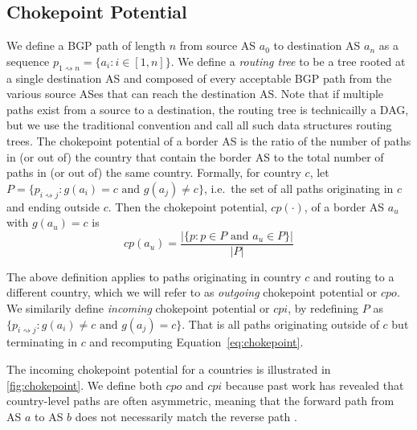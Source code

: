 \subsection{Chokepoint Potential}

We define a BGP path of length $n$ from source AS $a_0$ to destination AS $a_n$
as a sequence $p_{1\rightsquigarrow n} = \{a_i : i \in [1,n]\}$.  We define a
\textit{routing tree} to be a tree rooted at a single destination AS and
composed of every acceptable BGP path from the various source ASes that can
reach the destination AS. Note that if multiple paths exist from a source
to a destination, the routing tree is technicailly a DAG, but we use the traditional convention and call
all such data structures routing trees. The
chokepoint potential of a border AS is the ratio of the number of paths in (or out of) the country that contain the border AS to
the total number of paths in (or out of) the same country.
Formally, for country $c$, let $P = \{p_{i \rightsquigarrow
j} : g(a_i)=c \text{ and } g(a_j)\neq c\} $, i.e.\ the set of all paths
originating in $c$ and ending outside $c$. Then the chokepoint potential,
$cp(\cdot)$, of a border AS $a_u$ with $g(a_u) = c$ is
\begin{equation}
  \label{eq:chokepoint}
  cp(a_u) = \frac{|\{p: p \in P \text{ and } a_u \in P\}|}{|P|}
\end{equation}


The above definition applies to paths originating in country
$c$ and routing to a different country, which we will refer to as
\textit{outgoing} chokepoint potential or $cpo$. We similarily define
\textit{incoming} chokepoint potential or $cpi$, by redefining $P$ as $\{p_{i
\rightsquigarrow j}: g(a_i) \neq c \text{ and } g(a_j) = c\}$. That is all
paths originating outside of $c$ but terminating in $c$ and recomputing
Equation~\ref{eq:chokepoint}. 

The incoming chokepoint
potential for a countries is illustrated in \figurename
\ref{fig:chokepoint}. We define both $cpo$ and $cpi$ because past work
has revealed that country-level paths are often asymmetric, meaning that the
forward path from AS $a$ to AS $b$ does not necessarily match the reverse path
\cite{characterizingAndAvoiding}.

